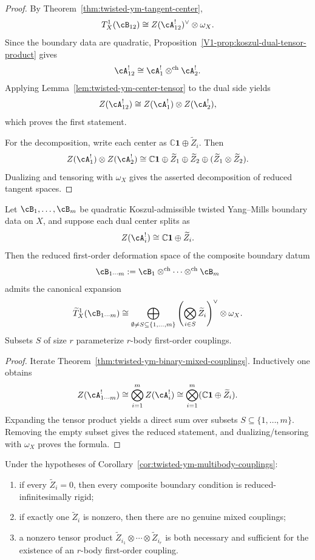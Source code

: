 \begin{proof}
By Theorem~\ref{thm:twisted-ym-tangent-center},
\[
T^1_X(\cB_{12})
\cong
Z(\cA_{12}^{!})^{\vee}\otimes \omega_X.
\]
Since the boundary data are quadratic, Proposition~\ref{V1-prop:koszul-dual-tensor-product} gives
\[
\cA_{12}^{!}
\cong
\cA_1^{!}\otimes^{\mathrm{ch}}\cA_2^{!}.
\]
Applying Lemma~\ref{lem:twisted-ym-center-tensor} to the dual side yields
\[
Z(\cA_{12}^{!})
\cong
Z(\cA_1^{!})\otimes Z(\cA_2^{!}),
\]
which proves the first statement.

For the decomposition, write each center as $\mathbb{C}\mathbf{1}\oplus \widetilde Z_i$. Then
\[
Z(\cA_1^{!})\otimes Z(\cA_2^{!})
\cong
\mathbb{C}\mathbf{1}
\oplus
\widetilde Z_1
\oplus
\widetilde Z_2
\oplus
(\widetilde Z_1\otimes \widetilde Z_2).
\]
Dualizing and tensoring with $\omega_X$ gives the asserted decomposition of reduced tangent spaces.
\end{proof}

\begin{corollary}
\label{cor:twisted-ym-multibody-couplings}
Let $\cB_1,\dots,\cB_m$ be quadratic Koszul-admissible twisted Yang--Mills boundary data on $X$, and suppose each dual center splits as
\[
Z(\cA_i^{!}) \cong \mathbb{C}\mathbf{1}\oplus \widetilde Z_i.
\]
Then the reduced first-order deformation space of the composite boundary datum
\[
\cB_{1\cdots m}
:=
\cB_1\otimes^{\mathrm{ch}}\cdots\otimes^{\mathrm{ch}}\cB_m
\]
admits the canonical expansion
\[
\widetilde T^1_X(\cB_{1\cdots m})
\cong
\bigoplus_{\emptyset \neq S \subseteq \{1,\dots,m\}}
\left(\bigotimes_{i\in S} \widetilde Z_i\right)^{\vee}\otimes \omega_X.
\]
Subsets $S$ of size $r$ parameterize $r$-body first-order couplings.
\end{corollary}

\begin{proof}
Iterate Theorem~\ref{thm:twisted-ym-binary-mixed-couplings}. Inductively one obtains
\[
Z(\cA_{1\cdots m}^{!})
\cong
\bigotimes_{i=1}^m Z(\cA_i^{!})
\cong
\bigotimes_{i=1}^m (\mathbb{C}\mathbf{1}\oplus \widetilde Z_i).
\]
Expanding the tensor product yields a direct sum over subsets $S\subseteq \{1,\dots,m\}$. Removing the empty subset gives the reduced statement, and dualizing/tensoring with $\omega_X$ proves the formula.
\end{proof}

\begin{corollary}
\label{cor:twisted-ym-mixed-rigidity}
Under the hypotheses of Corollary~\ref{cor:twisted-ym-multibody-couplings}:
\begin{enumerate}[label=(\roman*)]
\item if every $\widetilde Z_i=0$, then every composite boundary condition is reduced-infinitesimally rigid;
\item if exactly one $\widetilde Z_i$ is nonzero, then there are no genuine mixed couplings;
\item a nonzero tensor product $\widetilde Z_{i_1}\otimes\cdots\otimes\widetilde Z_{i_r}$ is both necessary and sufficient for the existence of an $r$-body first-order coupling.
\end{enumerate}
\end{corollary}

